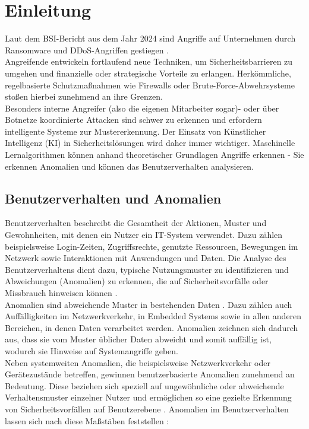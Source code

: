 \documentclass[a4paper,12pt]{article}
\begin{document}
	\section{Einleitung}
	Laut dem BSI-Bericht aus dem Jahr 2024 sind Angriffe auf Unternehmen durch Ransomware und DDoS-Angriffen gestiegen \cite{bsi2024lage}.
	\\[0.5em]
	Angreifende entwickeln fortlaufend neue Techniken, um Sicherheitsbarrieren zu umgehen und finanzielle oder strategische Vorteile zu erlangen. Herkömmliche, regelbasierte Schutzmaßnahmen wie Firewalls oder Brute-Force-Abwehrsysteme stoßen hierbei zunehmend an ihre Grenzen.
	\\[0.5em]
	Besonders interne Angreifer (also die eigenen Mitarbeiter sogar)- oder über Botnetze koordinierte Attacken sind schwer zu erkennen und erfordern intelligente Systeme zur Mustererkennung. Der Einsatz von Künstlicher Intelligenz (KI) in Sicherheitslösungen wird daher immer wichtiger.
	Maschinelle Lernalgorithmen können anhand theoretischer Grundlagen Angriffe erkennen - Sie erkennen Anomalien und können das Benutzerverhalten analysieren.
	
	\subsection{Benutzerverhalten und Anomalien}
	Benutzerverhalten beschreibt die Gesamtheit der Aktionen, Muster und Gewohnheiten, mit denen ein Nutzer ein IT-System verwendet. Dazu zählen beispielsweise Login-Zeiten, Zugriffsrechte, genutzte Ressourcen, Bewegungen im Netzwerk sowie Interaktionen mit Anwendungen und Daten. Die Analyse des Benutzerverhaltens dient dazu, typische Nutzungsmuster zu identifizieren und Abweichungen (Anomalien) zu erkennen, die auf Sicherheitsvorfälle oder Missbrauch hinweisen können \cite{thomas2021user, chandola2009anomaly}.
	\\[0.5em]
	Anomalien sind abweichende Muster in bestehenden Daten \cite{chandola2009anomaly}. Dazu zählen auch Auffälligkeiten im Netzwerkverkehr, in Embedded Systems sowie in allen anderen Bereichen, in denen Daten verarbeitet werden. Anomalien zeichnen sich dadurch aus, dass sie vom Muster üblicher Daten abweicht und somit auffällig ist, wodurch sie Hinweise auf Systemangriffe geben.
	\\[0.5em]
	Neben systemweiten Anomalien, die beispielsweise Netzwerkverkehr oder Gerätezustände betreffen, gewinnen benutzerbasierte Anomalien zunehmend an Bedeutung. Diese beziehen sich speziell auf ungewöhnliche oder abweichende Verhaltensmuster einzelner Nutzer und ermöglichen so eine gezielte Erkennung von Sicherheitsvorfällen auf Benutzerebene \cite{thomas2021user}.
	Anomalien im Benutzerverhalten lassen sich nach diese Maßstäben feststellen \cite{chandola2009anomaly, thomas2021user}:
	
\end{document}
